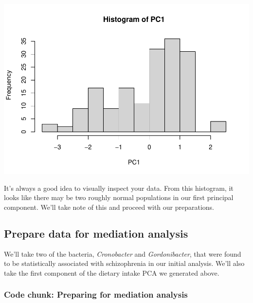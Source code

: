\documentclass[
]{article}
\newenvironment{Shaded}{\begin{snugshade}}{\end{snugshade}}
\newcommand{\AttributeTok}[1]{\textcolor[rgb]{0.77,0.63,0.00}{#1}}
\newcommand{\FunctionTok}[1]{\textcolor[rgb]{0.00,0.00,0.00}{#1}}
\newcommand{\NormalTok}[1]{#1}
\newcommand{\OtherTok}[1]{\textcolor[rgb]{0.56,0.35,0.01}{#1}}
\newcommand{\SpecialCharTok}[1]{\textcolor[rgb]{0.00,0.00,0.00}{#1}}
\newcommand{\StringTok}[1]{\textcolor[rgb]{0.31,0.60,0.02}{#1}}
\begin{document}
\includegraphics{README_part2_files/figure-latex/diet_pca-1.pdf}

It's always a good idea to visually inspect your data. From this
histogram, it looks like there may be two roughly normal populations in
our first principal component. We'll take note of this and proceed with
our preparations.

\hypertarget{prepare-data-for-mediation-analysis}{%
\subsection{Prepare data for mediation
analysis}\label{prepare-data-for-mediation-analysis}}

We'll take two of the bacteria, \emph{Cronobacter} and
\emph{Gordonibacter}, that were found to be statistically associated
with schizophrenia in our initial analysis. We'll also take the first
component of the dietary intake PCA we generated above.

\hypertarget{code-chunk-preparing-for-mediation-analysis}{%
\subsubsection{Code chunk: Preparing for mediation
analysis}\label{code-chunk-preparing-for-mediation-analysis}}

\begin{Shaded}
\end{Shaded}
\end{document}
